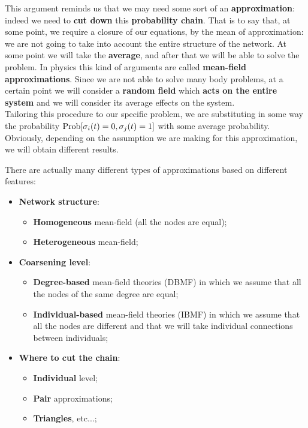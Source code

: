 \documentclass[../main/main.tex]{subfiles}
\begin{document}
This argument reminds us that we may need some sort of an \textbf{approximation}: indeed we need to \textbf{cut down} this \textbf{probability chain}. That is to say that, at some point, we require a closure of our equations, by the mean of approximation: we are not going to take into account the entire structure of the network. At some point we will take the \textbf{average}, and after that we will be able to solve the problem.
In physics this kind of arguments are called \textbf{mean-field approximations}. Since we are not able to solve many body problems, at a certain point we will consider a \textbf{random field} which \textbf{acts on the entire system} and we will consider its average effects on the system.\\
Tailoring this procedure to our specific problem, we are substituting in some way the probability \( \text{Prob} \qty[\sigma _i (t) = 0, \sigma _j (t ) =1 ]  \) with some average probability. Obviously, depending on the assumption we are making for this approximation, we will obtain different results.

There are actually many different types of approximations based on different features:
\begin{itemize}
\item \textbf{Network structure}:
    \begin{itemize}
    \item \textbf{Homogeneous} mean-field (all the nodes are equal);
    \item \textbf{Heterogeneous} mean-field;
    \end{itemize}
\item \textbf{Coarsening level}:
    \begin{itemize}
    \item \textbf{Degree-based} mean-field theories (DBMF) in which we assume that all the nodes of the same degree are equal;
    \item \textbf{Individual-based} mean-field theories (IBMF) in which we assume that all the nodes are different and that we will take individual connections between individuals;
    \end{itemize}
\item \textbf{Where to cut the chain}:
    \begin{itemize}
    \item \textbf{Individual} level;
    \item \textbf{Pair} approximations;
    \item \textbf{Triangles}, etc...;
    \end{itemize}
\end{itemize}
\end{document}
